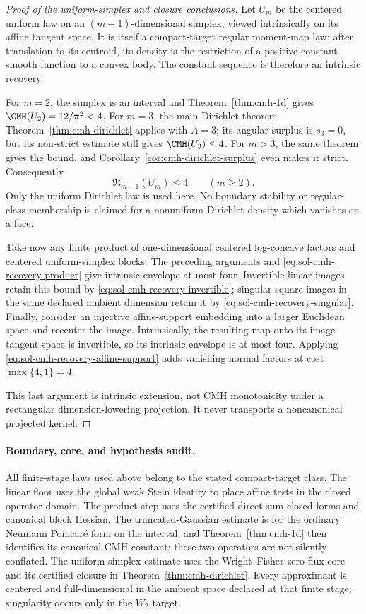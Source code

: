 \documentclass[../main.tex]{subfiles}
\begin{document}
\begin{proof}[Proof of the uniform-simplex and closure conclusions]
Let $U_m$ be the centered uniform law on an $(m-1)$-dimensional simplex, viewed intrinsically
on its affine tangent space.  It is itself a compact-target regular moment-map law: after
translation to its centroid, its density is the restriction of a positive constant smooth
function to a convex body.  The constant sequence is therefore an intrinsic recovery.

For $m=2$, the simplex is an interval and Theorem~\ref{thm:cmh-1d} gives
$\CMH(U_2)=12/\pi^2<4$.  For $m=3$, the main Dirichlet theorem
Theorem~\ref{thm:cmh-dirichlet} applies with $A=3$; its angular surplus is $s_3=0$, but its
non-strict estimate still gives $\CMH(U_3)\le4$.  For $m>3$, the same theorem gives the bound,
and Corollary~\ref{cor:cmh-dirichlet-surplus} even makes it strict.  Consequently
\[
  \mathfrak R_{m-1}(U_m)\le4
  \qquad(m\ge2).
\]
Only the uniform Dirichlet law is used here.  No boundary stability or regular-class membership
is claimed for a nonuniform Dirichlet density which vanishes on a face.

Take now any finite product of one-dimensional centered log-concave factors and centered
uniform-simplex blocks.  The preceding arguments and
\eqref{eq:sol-cmh-recovery-product} give intrinsic envelope at most four.  Invertible linear
images retain this bound by \eqref{eq:sol-cmh-recovery-invertible}; singular square images in
the same declared ambient dimension retain it by
\eqref{eq:sol-cmh-recovery-singular}.  Finally, consider an injective affine-support embedding
into a larger Euclidean space and recenter the image.  Intrinsically, the resulting map onto
its image tangent space is invertible, so its intrinsic envelope is at most four.  Applying
\eqref{eq:sol-cmh-recovery-affine-support} adds vanishing normal factors at cost
$\max\{4,1\}=4$.

This last argument is intrinsic extension, not CMH monotonicity under a rectangular
dimension-lowering projection.  It never transports a noncanonical projected kernel.
\end{proof}

\paragraph{Boundary, core, and hypothesis audit.}
All finite-stage laws used above belong to the stated compact-target class.  The linear floor
uses the global weak Stein identity to place affine tests in the closed operator domain.  The
product step uses the certified direct-sum closed forms and canonical block Hessian.  The
truncated-Gaussian estimate is for the ordinary Neumann Poincar\'e form on the interval, and
Theorem~\ref{thm:cmh-1d} then identifies its canonical CMH constant; these two operators are not
silently conflated.  The uniform-simplex estimate uses the Wright--Fisher zero-flux core and its
certified closure in Theorem~\ref{thm:cmh-dirichlet}.  Every approximant is centered and
full-dimensional in the ambient space declared at that finite stage; singularity occurs only
in the $W_2$ target.
\end{document}
